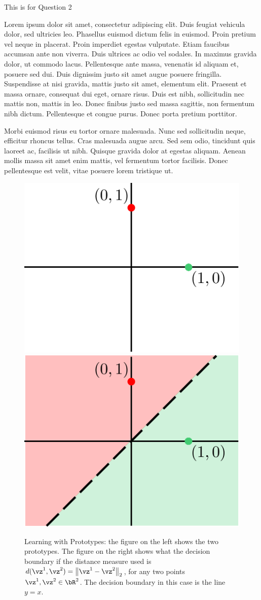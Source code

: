 \documentclass[a4paper,11pt]{article}
\begin{document}
\begin{mlsolution}
This is for Question 2

\end{mlsolution}

\begin{mlsolution}


Lorem ipsum dolor sit amet, consectetur adipiscing elit. Duis feugiat vehicula dolor, sed ultricies leo. Phasellus euismod dictum felis in euismod. Proin pretium vel neque in placerat. Proin imperdiet egestas vulputate. Etiam faucibus accumsan ante non viverra. Duis ultrices ac odio vel sodales. In maximus gravida dolor, ut commodo lacus. Pellentesque ante massa, venenatis id aliquam et, posuere sed dui. Duis dignissim justo sit amet augue posuere fringilla. Suspendisse at nisi gravida, mattis justo sit amet, elementum elit. Praesent et massa ornare, consequat dui eget, ornare risus. Duis est nibh, sollicitudin nec mattis non, mattis in leo. Donec finibus justo sed massa sagittis, non fermentum nibh dictum. Pellentesque et congue purus. Donec porta pretium porttitor.

Morbi euismod risus eu tortor ornare malesuada. Nunc sed sollicitudin neque, efficitur rhoncus tellus. Cras malesuada augue arcu. Sed sem odio, tincidunt quis laoreet ac, facilisis ut nibh. Quisque gravida dolor at egestas aliquam. Aenean mollis massa sit amet enim mattis, vel fermentum tortor facilisis. Donec pellentesque est velit, vitae posuere lorem tristique ut.

\begin{figure}[th]%
\centering
\includegraphics[width=0.4\columnwidth]{proto_blank.png}%
\hfill
\includegraphics[width=0.4\columnwidth]{proto_euclid_sample.png}%
\caption{Learning with Prototypes: the figure on the left shows the two prototypes. The figure on the right shows what the decision boundary if the distance measure used is $d(\vz^1,\vz^2) = \norm{\vz^1-\vz^2}_2$, for any two points $\vz^1,\vz^2 \in \bR^2$. The decision boundary in this case is the line $y = x$.}%
\label{fig:proto}%
\end{figure}


\end{mlsolution}
\end{document}

